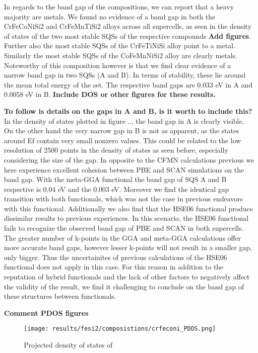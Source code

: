 In regards to the band gap of the compositions, we can report that a heavy majority are metals. We found no evidence of a band gap in both the CrFeCoNiSi2 and CrFeMnTiSi2 alloys across all supercells, as seen in the density of states of the two most stable SQSs of the respective compounds \textbf{Add figures}. Further also the most stable SQSs of the CrFeTiNiSi alloy point to a metal. Similarly the most stable SQSs of the CoFeMnNiSi2 alloy are clearly metals. Noteworthy of this composition however is that we find clear evidence of a narrow band gap in two SQSs (A and B). In terms of stability, these lie around the mean total energy of the set. The respective band gaps are 0.033 eV in A and 0.0058 eV in B. \textbf{Include DOS or other figures for these results.} 

\textbf{To follow is details on the gaps in A and B, is it worth to include this?}
In the density of states plotted in figure .., the band gap in A is clearly visible. On the other hand the very narrow gap in B is not as apparent, as the states around Ef contain very small nonzero values.  This could be related to the low resolution of 2500 points in the density of states as seen before, especially considering the size of the gap. In opposite to the CFMN calculations previous we here experience excellent cohesion between PBE and SCAN simulations on the band gap. With the meta-GGA functional the band gap of SQS A and B respective is 0.04 eV and the 0.003 eV. Moreover we find the identical gap transition with both functionals, which was not the case in previous endeavors with this functional. Additionally we also find that the HSE06 functional produce dissimilar results to previous experiences. In this scenario, the HSE06 functional fails to recognize the observed band gap of PBE and SCAN in both supercells. The greater number of k-points in the GGA and meta-GGA calculations offer more accurate band gaps, however lesser k-points will not result in a smaller gap, only bigger. Thus the uncertainites of previous calculations of the HSE06 functional does not apply in this case. For this reason in addition to the reputation of hybrid functionals and the lack of other factors to negatively affect the validity of the result, we find it challenging to conclude on the band gap of these structures between functionals.

\textbf{Comment PDOS figures} \\
\begin{figure}[H]
	\texttt{[image: results/fesi2/composistions/crfeconi\_PDOS.png]}
	\caption{Projected density of states of }
\end{figure}

